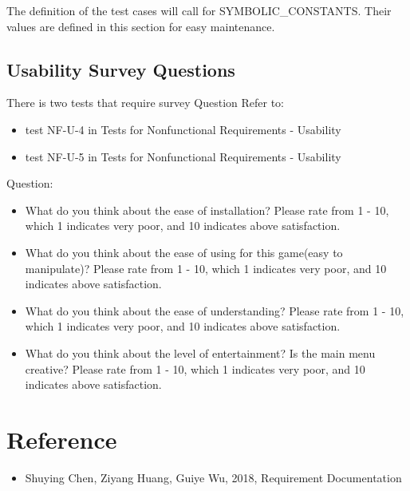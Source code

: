 \documentclass[12pt, titlepage]{article}
\begin{document}
The definition of the test cases will call for SYMBOLIC\_CONSTANTS.
Their values are defined in this section for easy maintenance.

\subsection{Usability Survey Questions}
There is two tests that require survey Question
Refer to:
\begin{itemize}
    \item test NF-U-4 in Tests for Nonfunctional Requirements - Usability
    \item test NF-U-5 in Tests for Nonfunctional Requirements - Usability
\end{itemize}
Question:
\begin{itemize}
    \item What do you think about the ease of installation? Please rate from 1 - 10, which 1 indicates very poor, and 10 indicates above satisfaction.
    \item What do you think about the ease of using for this game(easy to manipulate)? Please rate from 1 - 10, which 1 indicates very poor, and 10 indicates above satisfaction.
    \item What do you think about the ease of understanding? Please rate from 1 - 10, which 1 indicates very poor, and 10 indicates above satisfaction.
    \item What do you think about the level of entertainment? Is the main menu creative? Please rate from 1 - 10, which 1 indicates very poor, and 10 indicates above satisfaction.
\end{itemize}

\section{Reference}
\begin{itemize}
\item Shuying Chen, Ziyang Huang, Guiye Wu, 2018, Requirement Documentation
\end{itemize}
%
%
\newpage
\end{document}
